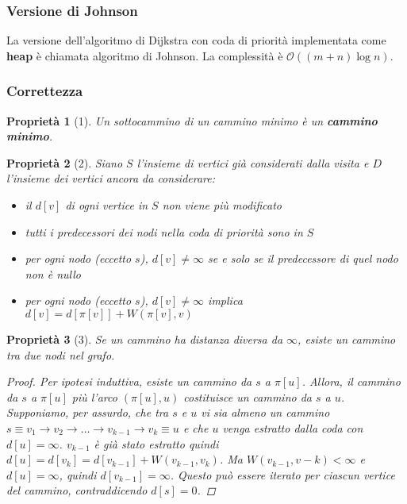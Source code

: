 \documentclass[11pt]{article}
\newtheorem*{proprietà}{Proprietà}
\begin{document}
\subsubsection{Versione di Johnson}
La versione dell'algoritmo di Dijkstra con coda di priorità implementata come \textbf{heap} è chiamata algoritmo di Johnson.
La complessità è $\mathcal{O}((m+n)\log n)$.
\subsubsection{Correttezza}
\begin{proprietà}[1]
    Un sottocammino di un cammino minimo è un \textbf{cammino minimo}.
\end{proprietà}
\begin{proprietà}[2]
    Siano $S$ l'insieme di vertici già considerati dalla visita e $D$ l'insieme dei vertici ancora da considerare:
    \begin{itemize}
        \item[2.1.] il $d[v]$ di ogni vertice in $S$ non viene più modificato
        \item[2.2.] tutti i predecessori dei nodi nella coda di priorità sono in $S$
        \item[2.3.] per ogni nodo (eccetto $s$), $d[v]\neq \infty$ se e solo se il predecessore di quel nodo non è nullo 
        \item[2.4.] per ogni nodo (eccetto $s$), $d[v]\neq \infty$ implica $d[v]=d[\pi[v]]+W(\pi[v],v)$
    \end{itemize}
\end{proprietà}
\begin{proprietà}[3]
    Se un cammino ha distanza diversa da $\infty$, esiste un cammino tra due nodi nel grafo.
    \begin{proof}
        Per ipotesi induttiva, esiste un cammino da $s$ a $\pi[u]$. Allora, il cammino da $s$ a $\pi[u]$ più l'arco 
        $(\pi[u],u)$ costituisce un cammino da $s$ a $u$.\\
        Supponiamo, per assurdo, che tra $s$ e $u$ vi sia almeno un cammino $s\equiv v_1\rightarrow v_2 \rightarrow \dots \rightarrow v_{k-1} \rightarrow v_k \equiv u$
        e che $u$ venga estratto dalla coda con $d[u]=\infty$. $v_{k-1}$ è già stato estratto quindi 
        $d[u]=d[v_k]=d[v_{k-1}]+W(v_{k-1},v_k)$. Ma $W(v_{k-1},v-k)<\infty$ e $d[u]=\infty$, quindi $d[v_{k-1}]=\infty$.
        Questo può essere iterato per ciascun vertice del cammino, contraddicendo $d[s]=0$.
    \end{proof}
\end{proprietà}
\end{document}
